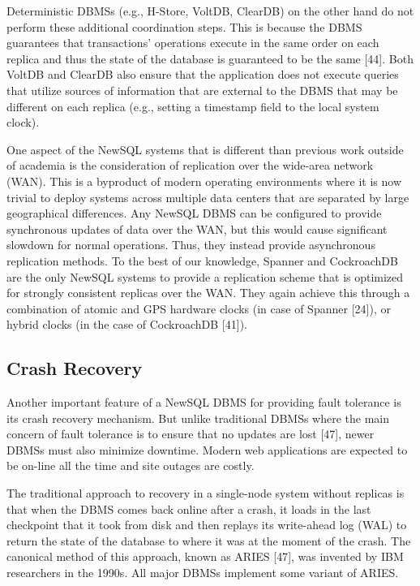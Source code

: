 \documentclass[a4paper,12pt,notitlepage,twoside,openright]{article}
\begin{document}
Deterministic DBMSs (e.g., H-Store, VoltDB, ClearDB) on the other hand
do not perform these additional coordination steps. This is because the
DBMS guarantees that transactions' operations execute in the same order
on each replica and thus the state of the database is guaranteed to be
the same {[}44{]}. Both VoltDB and ClearDB also ensure that the
application does not execute queries that utilize sources of information
that are external to the DBMS that may be different on each replica
(e.g., setting a timestamp field to the local system clock).

One aspect of the NewSQL systems that is different than previous work
outside of academia is the consideration of replication over the
wide-area network (WAN). This is a byproduct of modern operating
environments where it is now trivial to deploy systems across multiple
data centers that are separated by large geographical differences. Any
NewSQL DBMS can be configured to provide synchronous updates of data
over the WAN, but this would cause significant slowdown for normal
operations. Thus, they instead provide asynchronous replication methods.
To the best of our knowledge, Spanner and CockroachDB are the only
NewSQL systems to provide a replication scheme that is optimized for
strongly consistent replicas over the WAN. They again achieve this
through a combination of atomic and GPS hardware clocks (in case of
Spanner {[}24{]}), or hybrid clocks (in the case of CockroachDB
{[}41{]}).

\hypertarget{crash-recovery}{%
\subsection{Crash Recovery}\label{crash-recovery}}

Another important feature of a NewSQL DBMS for providing fault tolerance
is its crash recovery mechanism. But unlike traditional DBMSs where the
main concern of fault tolerance is to ensure that no updates are lost
{[}47{]}, newer DBMSs must also minimize downtime. Modern web
applications are expected to be on-line all the time and site outages
are costly.

The traditional approach to recovery in a single-node system without
replicas is that when the DBMS comes back online after a crash, it loads
in the last checkpoint that it took from disk and then replays its
write-ahead log (WAL) to return the state of the database to where it
was at the moment of the crash. The canonical method of this approach,
known as ARIES {[}47{]}, was invented by IBM researchers in the 1990s.
All major DBMSs implement some variant of ARIES.
\end{document}
